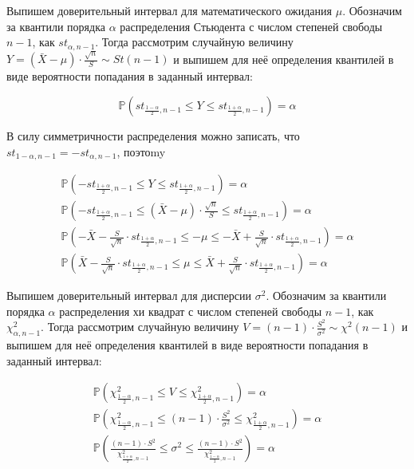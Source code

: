 \documentclass[11pt]{article}
\begin{document}
Выпишем доверительный интервал для математического ожидания $\mu$. Обозначим за квантили порядка $\alpha$ распределения Стьюдента с числом степеней свободы $n-1$, как $s t_{\alpha, n-1}$. Тогда рассмотрим случайную величину $Y=(\bar{X}-\mu) \cdot \frac{\sqrt{n}}{S} \sim S t(n-1)$ и выпишем для неё определения квантилей в виде вероятности попадания в заданный интервал:

$$
\mathbb{P}\left(s t_{\frac{1-\alpha}{2}, n-1} \leq Y \leq s t_{\frac{1+\alpha}{2}, n-1}\right)=\alpha
$$


В силу симметричности распределения можно записать, что $s t_{1-\alpha, n-1}=-s t_{\alpha, n-1}$, поэтоmy

$$
\begin{gathered}
\mathbb{P}\left(-s t_{\frac{1+\alpha}{2}, n-1} \leq Y \leq s t_{\frac{1+\alpha}{2}, n-1}\right)=\alpha \\
\mathbb{P}\left(-s t_{\frac{1+\alpha}{2}, n-1} \leq(\bar{X}-\mu) \cdot \frac{\sqrt{n}}{S} \leq s t_{\frac{1+\alpha}{2}, n-1}\right)=\alpha \\
\mathbb{P}\left(-\bar{X}-\frac{S}{\sqrt{n}} \cdot s t_{\frac{1+\alpha}{2}, n-1} \leq-\mu \leq-\bar{X}+\frac{S}{\sqrt{n}} \cdot s t_{\frac{1+\alpha}{2}, n-1}\right)=\alpha \\
\mathbb{P}\left(\bar{X}-\frac{S}{\sqrt{n}} \cdot s t_{\frac{1+\alpha}{2}, n-1} \leq \mu \leq \bar{X}+\frac{S}{\sqrt{n}} \cdot s t_{\frac{1+\alpha}{2}, n-1}\right)=\alpha
\end{gathered}
$$


Выпишем доверительный интервал для дисперсии $\sigma^2$. Обозначим за квантили порядка $\alpha$ распределения хи квадрат с числом степеней свободы $n-1$, как $\chi_{\alpha, n-1}^2$. Тогда рассмотрим случайную величину $V=(n-1) \cdot \frac{S^2}{\sigma^2} \sim \chi^2(n-1)$ и выпишем для неё определения квантилей в виде вероятности попадания в заданный интервал:

$$
\begin{gathered}
\mathbb{P}\left(\chi_{\frac{1-\alpha}{2}, n-1}^2 \leq V \leq \chi_{\frac{1+\alpha}{2}, n-1}^2\right)=\alpha \\
\mathbb{P}\left(\chi_{\frac{1-\alpha}{2}, n-1}^2 \leq(n-1) \cdot \frac{S^2}{\sigma^2} \leq \chi_{\frac{1+\alpha}{2}, n-1}^2\right)=\alpha \\
\mathbb{P}\left(\frac{(n-1) \cdot S^2}{\chi_{\frac{1+\alpha}{2}, n-1}^2} \leq \sigma^2 \leq \frac{(n-1) \cdot S^2}{\chi_{\frac{1-\alpha}{2}, n-1}^2}\right)=\alpha
\end{gathered}
$$
\end{document}
